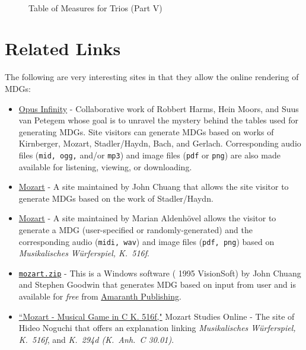 \documentclass[a4paper,x11names,svgnames,10pt]{article}
\begin{document}
{\newpage
${}_{}$\\
\vspace{0.10in}
\begin{figure}[H]
	\centering
	\def\svgwidth{0.975\columnwidth}
	
	\caption{Table of Measures for Trios (Part V)}
	\label{fig:meas5}
\end{figure}

\newpage
\section{Related Links}
The following are very interesting sites in that they allow the online rendering of MDGs:
\begin{itemize}
	\item \href{https://opus-infinity.org}{Opus Infinity} - Collaborative work of Robbert Harms, Hein Moors, and Suus van Petegem whose goal is to unravel the mystery behind the tables used for generating MDGs.  Site visitors can generate MDGs based on works of Kirnberger, Mozart, Stadler/Haydn, Bach, and Gerlach.  Corresponding audio files ({\tt mid, ogg,} and/or {\tt mp3}) and image files ({\tt pdf} or {\tt png}) are also made available for listening, viewing, or downloading.
	
	\item  \href{http://sunsite.univie.ac.at/Mozart/dice/}{Mozart} - A site maintained by John Chuang that allows the site visitor to generate MDGs based on the work of Stadler/Haydn.
 	
	\item  \href{https://marian-aldenhoevel.de/mozart/}{Mozart} - A site maintained by Marian Aldenh\"{o}vel allows the visitor to generate a MDG (user-specified or randomly-generated) and the corresponding audio ({\tt midi, wav}) and image files ({\tt pdf, png}) based on {\em Musikalisches W\"{u}rferspiel, K.\ 516f}.
 	
 	\item \href{https://www.amaranthpublishing.com/mozart.zip}{\tt mozart.zip} -  This is a Windows software ({\small\textcopyright} 1995 VisionSoft) by John Chuang and Stephen Goodwin that generates MDG based on input from user and is available for {\it free} from  \href{http://www.amaranthpublishing.com/MozartDiceGame.htm}{Amaranth Publishing}.  
 	
 	\item \href{(http://www.asahi-net.or.jp/\~rb5h-ngc/e/k516f.htm}{``Mozart - Musical Game in C K. 516f,"}	Mozart Studies Online - The site of Hideo Noguchi that offers an explanation linking {\em Musikalisches W\"{u}rferspiel, K.\ 516f}, and  {\em K.\ 294d (K.\ Anh.\ C 30.01)}. 
\end{itemize}

}
\end{document}
